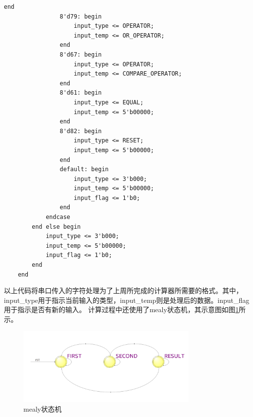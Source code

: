 \documentclass[UTF8]{ctexart}
\begin{document}
\begin{framed}
\begin{lstlisting}[style=verilogStyle]
                end
                8'd79: begin
                    input_type <= OPERATOR;
                    input_temp <= OR_OPERATOR;
                end
                8'd67: begin
                    input_type <= OPERATOR;
                    input_temp <= COMPARE_OPERATOR;
                end
                8'd61: begin
                    input_type <= EQUAL;
                    input_temp <= 5'b00000;
                end
                8'd82: begin
                    input_type <= RESET;
                    input_temp <= 5'b00000;
                end
                default: begin
                    input_type <= 3'b000;
                    input_temp <= 5'b00000;
                    input_flag <= 1'b0;
                end
            endcase
        end else begin
            input_type <= 3'b000;
            input_temp <= 5'b00000;
            input_flag <= 1'b0;
        end
    end
    \end{lstlisting}
\end{framed}
以上代码将串口传入的字符处理为了上周所完成的计算器所需要的格式。其中，input\_type用于指示当前输入的类型，input\_temp则是处理后的数据。input\_flag用于指示是否有新的输入。
计算过程中还使用了mealy状态机，其示意图如图\ref{fig:mealy}所示。
\begin{figure}[!ht]
    \centering
    \includegraphics[width=0.8\textwidth]{mealy.png}
    \caption{mealy状态机}
    \label{fig:mealy}
\end{figure}
\end{document}
